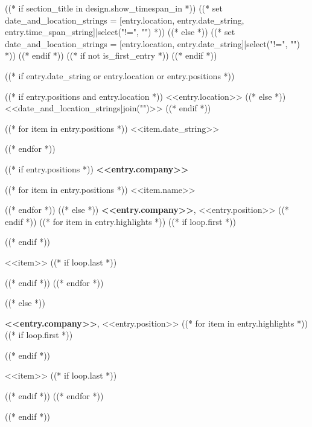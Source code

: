 ((* if section_title in design.show_timespan_in *))
    ((* set date_and_location_strings = [entry.location, entry.date_string, entry.time_span_string]|select("!=", "") *))
((* else *))
    ((* set date_and_location_strings = [entry.location, entry.date_string]|select("!=", "") *))
((* endif *))
((* if not is_first_entry *))
\vspace{<<design.margins.entry_area.vertical_between>>}
((* endif *))

((* if entry.date_string or entry.location or entry.positions *))
\begin{twocolentry}{
    ((* if entry.positions and entry.location *))
    <<entry.location>>
    ((* else *))
    <<date_and_location_strings|join("\n\n")>>
    ((* endif *))

    ((* for item in entry.positions *))
    <<item.date_string>>

    ((* endfor *))
}
    ((* if entry.positions *))
    \textbf{<<entry.company>>}

    ((* for item in entry.positions *))
    <<item.name>>

    ((* endfor *))
    ((* else *))
    \textbf{<<entry.company>>}, <<entry.position>>
    ((* endif *))
    ((* for item in entry.highlights *))
        ((* if loop.first *))
    \begin{highlights}
        ((* endif *))
        \item <<item>>
        ((* if loop.last *))
    \end{highlights}
        ((* endif *))
    ((* endfor *))
\end{twocolentry}
((* else *))
\begin{onecolentry}
    \textbf{<<entry.company>>}, <<entry.position>>
    ((* for item in entry.highlights *))
        ((* if loop.first *))
    \begin{highlights}
        ((* endif *))
        \item <<item>>
        ((* if loop.last *))
    \end{highlights}
        ((* endif *))
    ((* endfor *))
\end{onecolentry}
((* endif *))